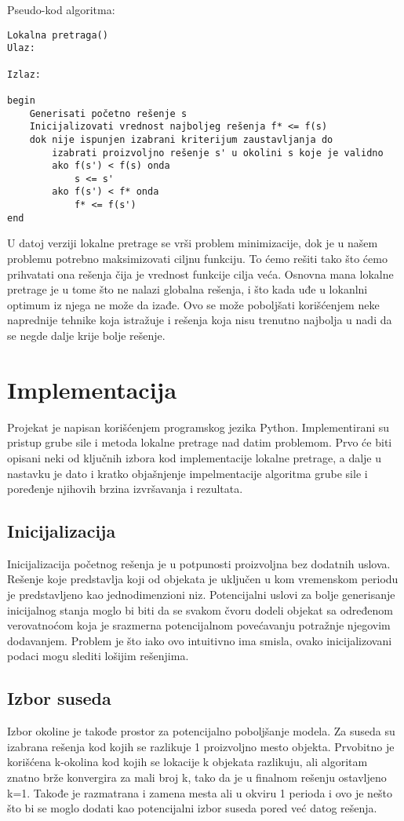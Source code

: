 \documentclass[a4paper]{article}
\begin{document}
Pseudo-kod algoritma:
\begin{verbatim}
Lokalna pretraga()
Ulaz:

Izlaz:

begin
    Generisati početno rešenje s
    Inicijalizovati vrednost najboljeg rešenja f* <= f(s)
    dok nije ispunjen izabrani kriterijum zaustavljanja do
        izabrati proizvoljno rešenje s' u okolini s koje je validno
        ako f(s') < f(s) onda
            s <= s'
        ako f(s') < f* onda
            f* <= f(s')	
end
\end{verbatim}

U datoj verziji lokalne pretrage se vrši problem minimizacije, dok je u našem problemu potrebno maksimizovati ciljnu funkciju. To ćemo rešiti tako što ćemo prihvatati ona rešenja čija je vrednost funkcije cilja veća. Osnovna mana lokalne pretrage je u tome što ne nalazi globalna rešenja, i što kada uđe u lokanlni optimum iz njega ne može da izađe. Ovo se može poboljšati korišćenjem neke naprednije tehnike koja istražuje i rešenja koja nisu trenutno najbolja u nadi da se negde dalje krije bolje rešenje.

\section{Implementacija}

Projekat je napisan korišćenjem programskog jezika Python. Implementirani su pristup grube sile i metoda lokalne pretrage nad datim problemom. Prvo će biti opisani neki od ključnih izbora kod implementacije lokalne pretrage, a dalje u nastavku je dato i kratko objašnjenje impelmentacije algoritma grube sile i poređenje njihovih brzina izvršavanja i rezultata.

\subsection{Inicijalizacija}
Inicijalizacija početnog rešenja je u potpunosti proizvoljna bez dodatnih uslova. Rešenje koje predstavlja koji od objekata je uključen u kom vremenskom periodu je predstavljeno kao jednodimenzioni niz. Potencijalni uslovi za bolje generisanje inicijalnog stanja moglo bi biti da se svakom čvoru dodeli objekat sa određenom verovatnoćom koja je srazmerna potencijalnom povećavanju potražnje njegovim dodavanjem. Problem je što iako ovo intuitivno ima smisla, ovako inicijalizovani podaci mogu slediti lošijim rešenjima.

\subsection{Izbor suseda}
Izbor okoline je takođe prostor za potencijalno poboljšanje modela. Za suseda su izabrana rešenja kod kojih se razlikuje 1 proizvoljno mesto objekta. Prvobitno je korišćena k-okolina kod kojih se lokacije k objekata razlikuju, ali algoritam znatno brže konvergira za mali broj k, tako da je u finalnom rešenju ostavljeno k=1. Takođe je razmatrana i zamena mesta ali u okviru 1 perioda i ovo je nešto što bi se moglo dodati kao potencijalni izbor suseda pored već datog rešenja.
\end{document}
